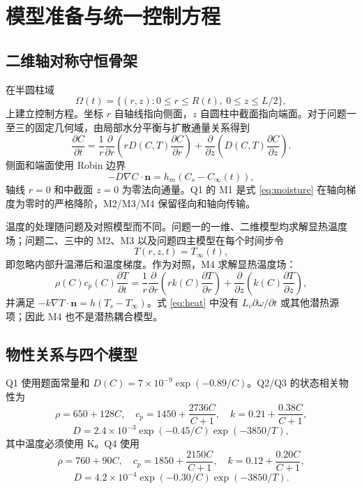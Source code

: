 \documentclass[withoutpreface,bwprint]{cumcmthesis}
\begin{document}
\section{模型准备与统一控制方程}

\subsection{二维轴对称守恒骨架}

在半圆柱域
\[
\Omega(t)=\{(r,z):0\le r\le R(t),\ 0\le z\le L/2\},
\]
上建立控制方程。坐标 \(r\) 自轴线指向侧面，\(z\) 自圆柱中截面指向端面。对于问题一至三的固定几何域，由局部水分平衡与扩散通量关系得到
\begin{equation}
\frac{\partial C}{\partial t}=\frac1r\frac{\partial}{\partial r}\left(rD(C,T)\frac{\partial C}{\partial r}\right)+\frac{\partial}{\partial z}\left(D(C,T)\frac{\partial C}{\partial z}\right).
\label{eq:moisture}
\end{equation}
侧面和端面使用 Robin 边界
\begin{equation}
-D\nabla C\cdot\boldsymbol n=h_m(C_s-C_\infty(t)),
\label{eq:mass-robin}
\end{equation}
轴线 \(r=0\) 和中截面 \(z=0\) 为零法向通量。Q1 的 M1 是式 \eqref{eq:moisture} 在轴向梯度为零时的严格降阶，M2/M3/M4 保留径向和轴向传输。

温度的处理随问题及对照模型而不同。问题一的一维、二维模型均求解显热温度场；问题二、三中的 M2、M3 以及问题四主模型在每个时间步令
\begin{equation}
T(r,z,t)=T_\infty(t),
\label{eq:prescribed-temperature}
\end{equation}
即忽略内部升温滞后和温度梯度。作为对照，M4 求解显热温度场：
\begin{equation}
\rho(C)c_p(C)\frac{\partial T}{\partial t}=\frac1r\frac{\partial}{\partial r}\left(rk(C)\frac{\partial T}{\partial r}\right)+\frac{\partial}{\partial z}\left(k(C)\frac{\partial T}{\partial z}\right),
\label{eq:heat}
\end{equation}
并满足 \(-k\nabla T\cdot\boldsymbol n=h(T_s-T_\infty)\)。式 \eqref{eq:heat} 中没有 \(L_v\partial\omega/\partial t\) 或其他潜热源项；因此 M4 也不是潜热耦合模型。

\subsection{物性关系与四个模型}

Q1 使用题面常量和 \(D(C)=7\times10^{-9}\exp(-0.89/C)\)。Q2/Q3 的状态相关物性为
\begin{equation}
\rho=650+128C,\quad c_p=1450+\frac{2736C}{C+1},\quad k=0.21+\frac{0.38C}{C+1},
\end{equation}
\begin{equation}
D=2.4\times10^{-3}\exp(-0.45/C)\exp(-3850/T),
\label{eq:props-q23}
\end{equation}
其中温度必须使用 K。Q4 使用
\begin{equation}
\rho=760+90C,\quad c_p=1850+\frac{2150C}{C+1},\quad k=0.12+\frac{0.20C}{C+1},
\end{equation}
\begin{equation}
D=4.2\times10^{-4}\exp(-0.30/C)\exp(-3850/T).
\label{eq:props-q4}
\end{equation}
\end{document}
